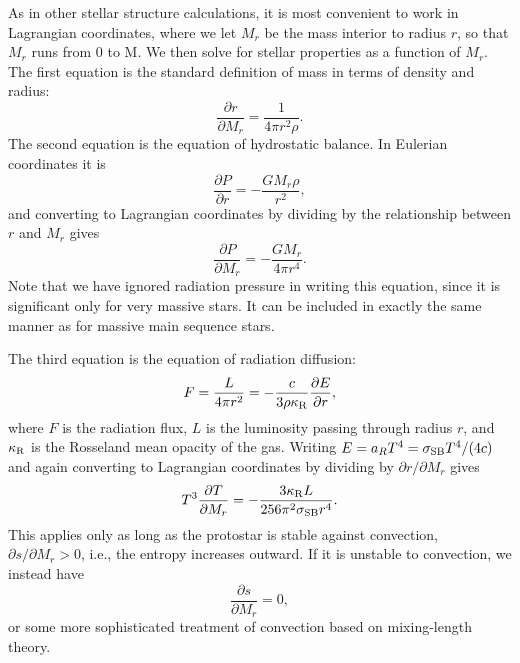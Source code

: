 As in other stellar structure calculations, it is most convenient to work in Lagrangian coordinates, where we let $M_r$ be the mass interior to radius $r$, so that $M_r$ runs from 0 to M. We then solve for stellar properties as a function of $M_r$. The first equation is the standard definition of mass in terms of density and radius:
\begin{equation}
\label{mass}
\frac{\partial r}{\partial M_r} = \frac{1}{4\pi r^2 \rho}.
\end{equation}
The second equation is the equation of hydrostatic balance. In Eulerian coordinates it is
\begin{equation}
\label{eq:hydrobalance}
\frac{\partial P}{\partial r} = -\frac{G M_r \rho}{r^2},
\end{equation}
and converting to Lagrangian coordinates by dividing by the relationship between $r$ and $M_r$ gives
\begin{equation}
\frac{\partial P}{\partial M_r} = -\frac{G M_r}{4\pi r^4}.
\end{equation}
Note that we have ignored radiation pressure in writing this equation, since it is significant only for very massive stars. It can be included in exactly the same manner as for massive main sequence stars.

The third equation is the equation of radiation diffusion:
\begin{equation}
F = \frac{L}{4\pi r^2} = -\frac{c}{3\rho\kappa_{\rm R}} \frac{\partial E}{\partial r},
\end{equation}
where $F$ is the radiation flux, $L$ is the luminosity passing through radius $r$, and $\kappa_{\rm R}$ is the Rosseland mean opacity of the gas. Writing $E=a_R T^4 = \sigma_{\rm SB} T^4/(4c)$ and again converting to Lagrangian coordinates by dividing by $\partial r/\partial M_r$ gives
\begin{equation}
T^3 \frac{\partial T}{\partial M_r} = - \frac{3\kappa_{\rm R} L}{256 \pi^2 \sigma_{\rm SB} r^4}.
\end{equation}
This applies only as long as the protostar is stable against convection, $\partial s/\partial M_r > 0$, i.e., the entropy increases outward. If it is unstable to convection, we instead have
\begin{equation}
\frac{\partial s}{\partial M_r} = 0,
\end{equation}
or some more sophisticated treatment of convection based on mixing-length theory.

